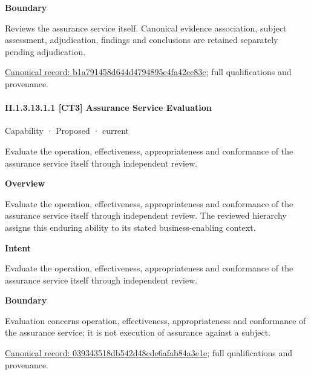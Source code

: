 \textbf{Boundary}



Reviews the assurance service itself. Canonical evidence association, subject assessment, adjudication, findings and conclusions are retained separately pending adjudication.


{\footnotesize \href{../../../../continuum/strategy/capability/b1a791458d644d4794895e4fa42ec83c.md}{Canonical record: b1a791458d644d4794895e4fa42ec83c}; full qualifications and provenance.}\par
\paragraph*{II.1.3.13.1.1 [CT3] Assurance Service Evaluation}
\label{navigation:II.1.3.13.1.1}

\label{element:039343518db542d48cde6afab84a3e1e}
{\small Capability · Proposed · current}\par

Evaluate the operation, effectiveness, appropriateness and conformance of the assurance service itself through independent review.



\textbf{Overview}



Evaluate the operation, effectiveness, appropriateness and conformance of the assurance service itself through independent review. The reviewed hierarchy assigns this enduring ability to its stated business-enabling context.



\textbf{Intent}



Evaluate the operation, effectiveness, appropriateness and conformance of the assurance service itself through independent review.



\textbf{Boundary}



Evaluation concerns operation, effectiveness, appropriateness and conformance of the assurance service; it is not execution of assurance against a subject.


{\footnotesize \href{../../../../continuum/strategy/capability/039343518db542d48cde6afab84a3e1e.md}{Canonical record: 039343518db542d48cde6afab84a3e1e}; full qualifications and provenance.}\par
